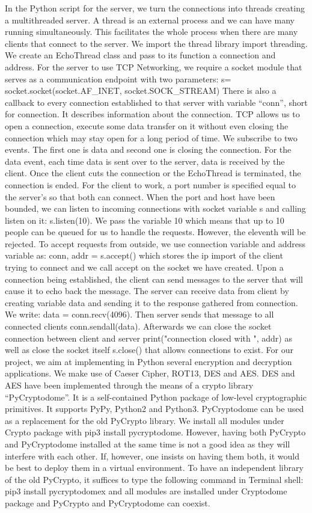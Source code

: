 In the Python script for the server, we turn the connections into threads creating a multithreaded server. A thread is an external process and we can have many running simultaneously. This facilitates the whole process when there are many clients that connect to the server. We import the thread library import threading. We create an EchoThread class and pass to its function a connection and address. For the server to use TCP Networking, we require a socket module that serves as a communication endpoint with two parameters:
s= socket.socket(socket.AF_INET, socket.SOCK_STREAM)
There is also a callback to every connection established to that server with variable “conn”, short for connection. It describes information about the connection. TCP allows us to open a connection, execute some data transfer on it without even closing the connection which may stay open for a long period of time. We subscribe to two events. The first one is data and second one is closing the connection. For the data event, each time data is sent over to the server, data is received by the client. Once the client cuts the connection or the EchoThread is terminated, the connection is ended.
For the client to work, a port number is specified equal to the server’s so that both can connect. When the port and host have been bounded, we can listen to incoming connections with socket variable s and calling listen on it: s.listen(10). We pass the variable 10 which means that up to 10 people can be queued for us to handle the requests. However, the eleventh will be rejected. To accept requests from outside, we use connection variable and address variable as: conn, addr = s.accept() which stores the ip import of the client trying to connect and we call accept on the socket we have created. Upon a connection being established, the client can send messages to the server that will cause it to echo back the message. The server can receive data from client by creating variable data and sending it to the response gathered from connection. We write: data = conn.recv(4096). Then server sends that message to all connected clients conn.sendall(data). Afterwards we can close the socket connection between client and server print("connection closed with ", addr) as well as close the socket itself s.close() that allows connections to exist.
For our project, we aim at implementing in Python several encryption and decryption applications. We make use of Caeser Cipher, ROT13, DES and AES.
DES and AES have been implemented through the means of a crypto library “PyCryptodome”. It is a self-contained Python package of low-level cryptographic primitives. It supports PyPy, Python2 and Python3. PyCryptodome can be used as a replacement for the old PyCrypto library. We install all modules under Crypto package with pip3 install pycryptodome.  However, having both PyCrypto and PyCryptodome installed at the same time is not a good idea as they will interfere with each other. If, however, one insists on having them both, it would be best to deploy them in a virtual environment. To have an independent library of the old PyCrypto, it suffices to type the following command in Terminal shell: pip3 install pycryptodomex and all modules are installed under Cryptodome package and PyCrypto and PyCryptodome can coexist. 


